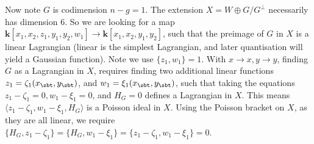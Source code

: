     Now note \(G\) is codimension \(n-g=1\). The extension \(X = W\oplus G/G^{\perp}\) necessarily has dimension \(6\). So we are looking for a map \(\mathbf{k}[x_1,x_2,z_1,y_1,y_2,w_1] \rightarrow \mathbf{k}[x_1,x_2,y_1,y_2]\), such that the preimage of \(G\) in \(X\) is a linear Lagrangian (linear is the simplest Lagrangian, and later quantisation will yield a Gaussian function). 
    Note we use \( \{z_1,w_1\} = 1\). With \(x\rightarrow x, y \rightarrow y\), finding \(G\) as a Lagrangian in \(X\), requires finding two additional linear functions \(z_1 = \zeta_1(x_{\sbt},y_{\sbt})\), and \(w_1 = \xi_1(x_{\sbt},y_{\sbt})\), such that taking the equations \( z_1 - \zeta_1 = 0, w_1 - \xi_1 = 0\), and \(H_G = 0\) defines a Lagrangian in \(X\). This means 
    \( \langle z_1 - \zeta_1,  w_1 - \xi_1, H_G \rangle \) 
    is a Poisson ideal in \(X\).  Using the Poisson bracket on \(X\), as they are all linear, we require \( \{H_G,z_1 -\zeta_1\} = \{ H_G,w_1 - \xi_1\} =   \{z_1 - \zeta_1,w_1 - \xi_1\} = 0\). 
    
    
